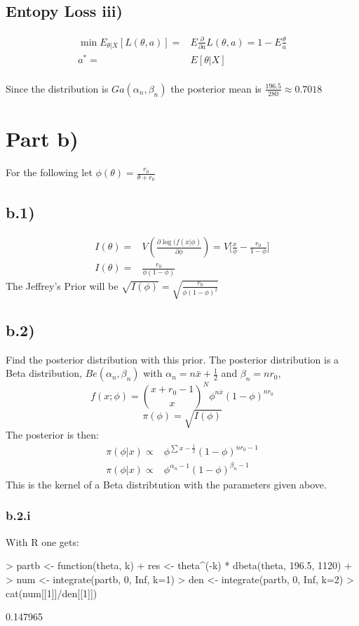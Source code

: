 \documentclass{article}
\begin{document}
\subsection*{Entopy Loss iii)}

\begin{align*}
\min E_{\theta|X} [L(\theta, a)] = & E \frac{\partial}{\partial a} L(\theta, a) = 1 -E \frac{\theta}{a} \\
a^*  =& E[\theta|X] 
\end{align*}
\\
Since the  distribution is $Ga(\alpha_n, \beta_n)$ the posterior mean is $\frac{196.5}{280} \approx 0.7018$

\section*{Part b)}
For the following let $ \phi(\theta) = \frac{r_0}{\theta + r_0} $ %
\subsection*{b.1)}

\begin{align*} 
I(\theta) = &  V(\frac{\partial \log(f(x|\phi)}{\partial \phi}) = V \Big[\frac{x}{\phi} - \frac{r_0}{1-\phi} \Big] \\
I(\theta) = & \frac{r_0}{\phi(1-\phi)}
\end{align*}
The Jeffrey's Prior will be $ \sqrt{I(\phi)} = \sqrt{\frac{r_0}{\phi(1-\phi)^2}} $

\subsection*{b.2)} Find the posterior distribution with this prior. The posterior distribution is a Beta distribution, $ Be(\alpha_n, \beta_n) $ with $\alpha_n = n\bar{x} + \frac{1}{2} $ and $\beta_n = nr_0 $,
$$ f(x;\phi) ={ {x + r_0 - 1 }\choose{x}}^N  \phi^{n \bar{x} } (1-\phi)^{n r_0}  $$
$$ \pi(\phi) = \sqrt{I(\phi)} $$
The posterior is then:
\begin{align*}
\pi(\phi|x) \propto & \phi^{\sum x- \frac{1}{2}} (1 - \phi)^{n r_0 - 1} \\
\pi(\phi|x) \propto &\phi^{\alpha_n - 1}(1 - \phi)^{\beta_n - 1}
\end{align*}
This is the kernel of a Beta distribtution with the parameters given above. 
\subsubsection*{b.2.i}
With R one gets:
\begin{Schunk}
\begin{Sinput}
> partb <- function(theta, k){
+   res <- theta^(-k) * dbeta(theta, 196.5, 1120)
+ }
> num <- integrate(partb, 0, Inf, k=1)
> den <- integrate(partb, 0, Inf, k=2)
> cat(num[[1]]/den[[1]])
\end{Sinput}
\begin{Soutput}
0.147965
\end{Soutput}
\end{Schunk}
\end{document}
